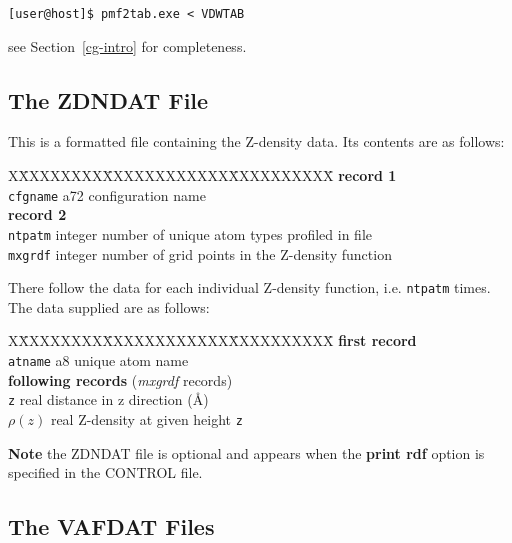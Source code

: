 {\tt [user@host]\$ pmf2tab.exe < VDWTAB}


see Section~\ref{cg-intro} for completeness.

\subsection{The ZDNDAT File}
\label{zdn-file}

This is a formatted file containing the Z-density data.  Its
contents are as follows:
\begin{tabbing}
X\=XXXXXXXX\=XXXXXXXXXXXX\=XXXXXXXXXX\=\kill
{\bf record 1} \\
\> {\tt cfgname} \> a72    \> configuration name \\
{\bf record 2} \\
\> {\tt ntpatm}  \> integer \> number of unique atom types profiled in file \\
\> {\tt mxgrdf}  \> integer \> number of grid points in the Z-density function\
\end{tabbing}
There follow the data for each individual Z-density function, i.e.
{\tt ntpatm} times. The data supplied are as follows:
\begin{tabbing}
X\=XXXXXXXX\=XXXXXXXXXXXX\=XXXXXXXXXX\=\kill
{\bf first record} \\
\> {\tt atname}  \> a8      \> unique atom name \\
{\bf following records} ({\em mxgrdf} records) \\
\> {\tt z}       \> real    \> distance in z direction (\AA) \\
\> $\rho(z)$     \> real    \> Z-density at given height {\tt z}
\end{tabbing}

{\bf Note} the ZDNDAT file is optional and appears when the {\bf print
rdf} option is specified in the CONTROL file.

\subsection{The VAFDAT Files}
\label{vaf-files}

